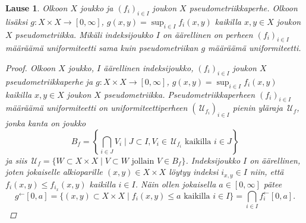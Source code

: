 \documentclass[12pt,a4paper,leqno]{report}
\newcommand{\U}{\,\mathcal{U}}
\newcommand{\Pot}{\mathcal{P}}
\theoremstyle{plain}
\newtheorem{lause}[equation]{Lause}
\theoremstyle{definition}
\theoremstyle{remark}
\begin{document}
\begin{lause}
%
%
Olkoon $X$ joukko ja 
$(f_i)_{i\in I} $ joukon $X$ pseudometriikkaperhe. 
Olkoon lisäksi $g\colon X\times X\rightarrow [0,\infty]$, 
$g(x,y)=\sup_{i\in I} f_i(x,y)$ kaikilla $x,y\in X$ 
joukon $X$ pseudometriikka. 
Mikäli indeksijoukko $I$ on äärellinen on perheen $(f_i)_{i\in I}$ määräämä 
uniformiteetti sama kuin pseudometriikan $g$ määräämä uniformiteetti.
\begin{proof}
Olkoon $X$ joukko, $I$ äärellinen indeksijoukko, 
$(f_i)_{i\in I} $ joukon $X$ pseudometriikkaperhe ja 
$g\colon X\times X\rightarrow [0,\infty]$, 
$g(x,y)=\sup_{i\in I} f_i(x,y)$ kaikilla $x,y\in X$ 
joukon $X$ pseudometriikka. 
Pseudometriikkaperheen $(f_i)_{i\in I} $ määräämä uniformiteetti on 
uniformiteettiperheen $(\U_{f_i})_{i\in I} $ pienin yläraja $\U_f$, 
jonka kanta on joukko 
$$B_f=\left\{\bigcap_{i\in J}V_i\mid J\subset I, V_i\in \U_{f_i} \text{ kaikilla }i\in J\right\}$$
ja siis 
$\U_f=\{W\subset X\times X\mid V\subset W\text{ jollain }V\in B_f\}$.
%
Indeksijoukko $I$ on äärellinen, 
joten jokaiselle alkioparille $(x,y)\in X\times X$ löytyy indeksi $i_{x,y}\in I$ niin, 
että $f_i(x,y)\leq f_{i_x}(x,y)$ kaikilla $i\in I$.
Näin ollen jokaisella $a\in [0,\infty]$ pätee  
$$g^\leftarrow[0,a]=\{(x,y)\subset X\times X\mid 
f_i(x,y)\leq a \text{ kaikilla } i\in I
\}=\bigcap_{i\in I} f_i^\leftarrow[0,a].$$

\end{proof}
\end{lause}
\end{document}
